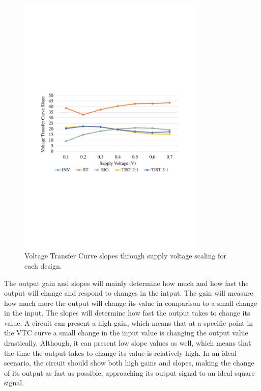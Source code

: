 \documentclass[diss,pgmicro,english]{iiufrgs}
\begin{document}
    \begin{figure}[h]
        \centering
            \includegraphics[width=0.8\textwidth, trim={1.25cm 9cm 2cm 10cm}, clip]{slopes.pdf}
            \caption{Voltage Transfer Curve slopes through supply voltage scaling for each design.}
        \label{fig:slopes}
    \end{figure}

The output gain and slopes will mainly determine how much and how fast the output will change and respond to changes in the intput. The gain will measure how much more the output will change its value in comparison to a small change in the input. The slopes will determine how fast the output takes to change its value. A circuit can present a high gain, which means that at a specific point in the VTC curve a small change in the input value is changing the output value drastically. Although, it can present low slope values as well, which means that the time the output takes to change its value is relatively high. In an ideal scenario, the circuit should show both high gains and slopes, making the change of its output as fast as possible, approaching its output signal to an ideal square signal.
\end{document}

